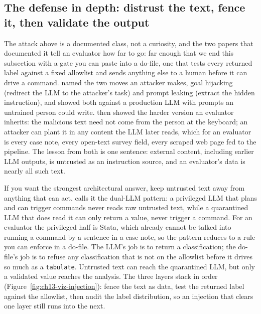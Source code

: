 \subsection{The defense in depth: distrust the text, fence it, then validate the output}\label{sec:ch13-injection-depth}
The attack above is a documented class, not a curiosity, and the two papers that documented it tell an evaluator how far to go: far enough that we end this subsection with a gate you can paste into a do-file, one that tests every returned label against a fixed allowlist and sends anything else to a human before it can drive a command. \textcite{perez2022ignore} named the two moves an attacker makes, goal hijacking (redirect the LLM to the attacker's task) and prompt leaking (extract the hidden instruction), and showed both against a production LLM with prompts an untrained person could write. \textcite{greshake2023injection} then showed the harder version an evaluator inherits: the malicious text need not come from the person at the keyboard; an attacker can plant it in any content the LLM later reads, which for an evaluator is every case note, every open-text survey field, every scraped web page fed to the pipeline. The lesson from both is one sentence: external content, including earlier LLM outputs, is untrusted as an instruction source, and an evaluator's data is nearly all such text.

If you want the strongest architectural answer, keep untrusted text away from anything that can act. \textcite{willison2023dual} calls it the dual-LLM pattern: a privileged LLM that plans and can trigger commands never reads raw untrusted text, while a quarantined LLM that does read it can only return a value, never trigger a command. For an evaluator the privileged half is Stata, which already cannot be talked into running a command by a sentence in a case note, so the pattern reduces to a rule you can enforce in a do-file. The LLM's job is to return a classification; the do-file's job is to refuse any classification that is not on the allowlist before it drives so much as a \texttt{tabulate}. Untrusted text can reach the quarantined LLM, but only a validated value reaches the analysis. The three layers stack in order (Figure~\ref{fig:ch13-viz-injection}): fence the text as data, test the returned label against the allowlist, then audit the label distribution, so an injection that clears one layer still runs into the next.

